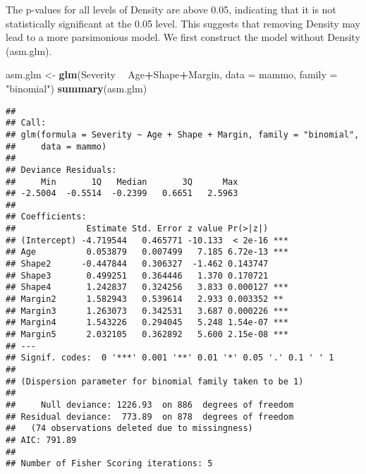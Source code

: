 \documentclass[]{article}
\newenvironment{Shaded}{\begin{snugshade}}{\end{snugshade}}
\newcommand{\KeywordTok}[1]{\textcolor[rgb]{0.13,0.29,0.53}{\textbf{#1}}}
\newcommand{\DataTypeTok}[1]{\textcolor[rgb]{0.13,0.29,0.53}{#1}}
\newcommand{\StringTok}[1]{\textcolor[rgb]{0.31,0.60,0.02}{#1}}
\newcommand{\OperatorTok}[1]{\textcolor[rgb]{0.81,0.36,0.00}{\textbf{#1}}}
\newcommand{\NormalTok}[1]{#1}
\begin{document}
The p-values for all levels of Density are above 0.05, indicating that
it is not statistically significant at the 0.05 level. This suggests
that removing Density may lead to a more parsimonious model. We first
construct the model without Density (asm.glm).

\begin{Shaded}
\begin{Highlighting}[]
\NormalTok{asm.glm <-}\StringTok{ }\KeywordTok{glm}\NormalTok{(Severity }\OperatorTok{~}\StringTok{ }\NormalTok{Age}\OperatorTok{+}\NormalTok{Shape}\OperatorTok{+}\NormalTok{Margin, }\DataTypeTok{data =}\NormalTok{ mammo, }\DataTypeTok{family =} \StringTok{"binomial"}\NormalTok{)}
\KeywordTok{summary}\NormalTok{(asm.glm)}
\end{Highlighting}
\end{Shaded}

\begin{verbatim}
## 
## Call:
## glm(formula = Severity ~ Age + Shape + Margin, family = "binomial", 
##     data = mammo)
## 
## Deviance Residuals: 
##     Min       1Q   Median       3Q      Max  
## -2.5004  -0.5514  -0.2399   0.6651   2.5963  
## 
## Coefficients:
##              Estimate Std. Error z value Pr(>|z|)    
## (Intercept) -4.719544   0.465771 -10.133  < 2e-16 ***
## Age          0.053879   0.007499   7.185 6.72e-13 ***
## Shape2      -0.447844   0.306327  -1.462 0.143747    
## Shape3       0.499251   0.364446   1.370 0.170721    
## Shape4       1.242837   0.324256   3.833 0.000127 ***
## Margin2      1.582943   0.539614   2.933 0.003352 ** 
## Margin3      1.263073   0.342531   3.687 0.000226 ***
## Margin4      1.543226   0.294045   5.248 1.54e-07 ***
## Margin5      2.032105   0.362892   5.600 2.15e-08 ***
## ---
## Signif. codes:  0 '***' 0.001 '**' 0.01 '*' 0.05 '.' 0.1 ' ' 1
## 
## (Dispersion parameter for binomial family taken to be 1)
## 
##     Null deviance: 1226.93  on 886  degrees of freedom
## Residual deviance:  773.89  on 878  degrees of freedom
##   (74 observations deleted due to missingness)
## AIC: 791.89
## 
## Number of Fisher Scoring iterations: 5
\end{verbatim}
\end{document}
